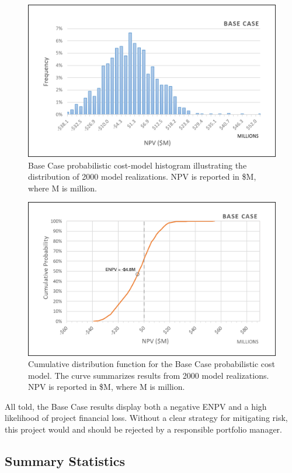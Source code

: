 \begin{figure}
\centering
\includegraphics[width=.8\textwidth]{templates/images/Figure-Base_Case_Histogram.png}
\caption[Base Case histogram]{Base Case probabilistic cost-model histogram illustrating the distribution of 2000 model realizations. NPV is reported in \$M, where M is million.}
\label{fig:base_case_hist}
\end{figure}

\begin{figure}
\centering
\includegraphics[width=.8\textwidth]{templates/images/Figure-Base_Case_CDF.png}
\caption[Base Case CDF]{Cumulative distribution function for the Base Case probabilistic cost model. The curve summarizes results from 2000 model realizations. NPV is reported in \$M, where M is million.}
\label{fig:base_case_cdf}
\end{figure}

All told, the Base Case results display both a negative ENPV and a high likelihood of project financial loss. Without a clear strategy for mitigating risk, this project would and should be rejected by a responsible portfolio manager.
\pagebreak
\subsection{Summary Statistics}\label{ch6:base_stats}

